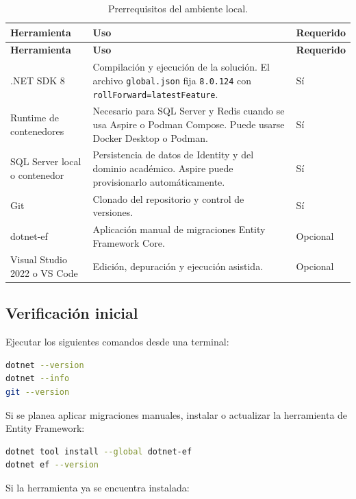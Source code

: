 \documentclass[12pt,letterpaper]{article}
\begin{document}
\begin{longtable}{p{}p{}p{}}
\caption{Prerrequisitos del ambiente local.}
\label{tab:prerrequisitos}\\
\toprule
\textbf{Herramienta} & \textbf{Uso} & \textbf{Requerido} \\
\midrule
\endfirsthead
\toprule
\textbf{Herramienta} & \textbf{Uso} & \textbf{Requerido} \\
\midrule
\endhead
.NET SDK 8 & Compilaci\'on y ejecuci\'on de la soluci\'on. El archivo \texttt{global.json} fija \texttt{8.0.124} con \texttt{rollForward=latestFeature}. & S\'i \\
Runtime de contenedores & Necesario para SQL Server y Redis cuando se usa Aspire o Podman Compose. Puede usarse Docker Desktop o Podman. & S\'i \\
SQL Server local o contenedor & Persistencia de datos de Identity y del dominio acad\'emico. Aspire puede provisionarlo autom\'aticamente. & S\'i \\
Git & Clonado del repositorio y control de versiones. & S\'i \\
dotnet-ef & Aplicaci\'on manual de migraciones Entity Framework Core. & Opcional \\
Visual Studio 2022 o VS Code & Edici\'on, depuraci\'on y ejecuci\'on asistida. & Opcional \\
\bottomrule
\end{longtable}

\subsection{Verificaci\'on inicial}

Ejecutar los siguientes comandos desde una terminal:

\begin{lstlisting}[language=bash,caption={Verificaci\'on de herramientas base.}]
dotnet --version
dotnet --info
git --version
\end{lstlisting}

Si se planea aplicar migraciones manuales, instalar o actualizar la herramienta de Entity Framework:

\begin{lstlisting}[language=bash,caption={Instalaci\'on de dotnet-ef.}]
dotnet tool install --global dotnet-ef
dotnet ef --version
\end{lstlisting}

Si la herramienta ya se encuentra instalada:
\end{document}
